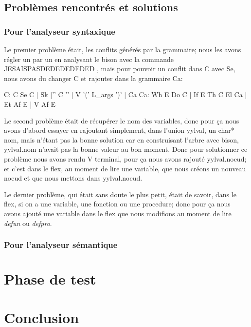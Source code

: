 \documentclass[10pt,a4paper]{article}
\begin{document}
\subsection{Problèmes rencontrés et solutions}
\subsubsection {Pour l'analyseur syntaxique}
Le premier problème était, les conflits générés par la grammaire; nous les avons régler un par un en analysant le bison avec la commande JESAISPASDEDEDEDEDED , mais pour pouvoir un conflit dans C avec Se, nous avons du changer C et rajouter dans la grammaire Ca: 

C: C Se C
	| Sk
	|'{' C '}'
	| V '(' L_args ')'
	| Ca
Ca: Wh E Do C
	| If E Th C El Ca
	| Et Af E
	| V Af E

Le second problème était de récupérer le nom des variables, donc pour ça nous avons d'abord essayer en rajoutant simplement, dans l'union yylval, un char* nom, mais n'étant pas la bonne solution car en construisant l'arbre avec bison, yylval.nom n'avait pas la bonne valeur au bon moment. Donc pour solutionner ce problème nous avons rendu V terminal, pour ça nous avons rajouté yylval.noeud; et c'est dans le flex, au moment de lire une variable, que nous créons un nouveau noeud et que nous mettons dans yylval.noeud.

Le dernier problème, qui était sans doute le plus petit, était de savoir, dans le flex, si on a une variable, une fonction ou une procedure; donc pour ça nous avons ajouté une variable dans le flex que nous modifions au moment de lire \textit{defun} ou \textit{defpro}.
\subsubsection {Pour l'analyseur sémantique}


\section{Phase de test}


\newpage
\section{Conclusion}
\end{document}
